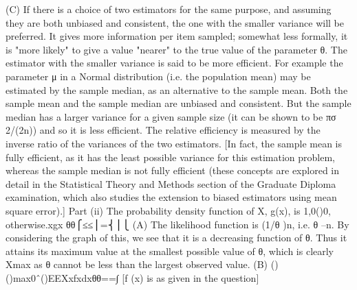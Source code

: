 \documentclass{article}
\begin{document}
\begin{enumerate}[(i)]
(C) If there is a choice of two estimators for the same purpose, and assuming they are both unbiased and consistent, the one with the smaller variance will be preferred. It gives more information per item sampled; somewhat less formally, it is "more likely" to give a value "nearer" to the true value of the parameter θ. The estimator with the smaller variance is said to be more efficient. For example the parameter μ in a Normal distribution (i.e. the population mean) may be estimated by the sample median, as an alternative to the sample mean. Both the sample mean and the sample median are unbiased and consistent. But the sample median has a larger variance for a given sample size (it can be shown to be πσ 2/(2n)) and so it is less efficient. The relative efficiency is measured by the inverse ratio of the variances of the two estimators. [In fact, the sample mean is fully efficient, as it has the least possible variance for this estimation problem, whereas the sample median is not fully efficient (these concepts are explored in detail in the Statistical Theory and Methods section of the
                                                                                                                                                                                                                                                                                                                                                                                                                                                                                                                                                                                                                                                                                                                                                                                                                                                                                                                                                                                                                                                   Graduate Diploma examination, which also studies the extension to biased estimators using mean square error).]
Part (ii)
The probability density function of X, g(x), is 1,0()0, otherwise.xgx θθ⎧≤≤⎪=⎨⎪⎩
(A) The likelihood function is (1/θ )n, i.e. θ –n. By considering the graph of this, we see that it is a decreasing function of θ. Thus it attains its maximum value at the smallest possible value of θ, which is clearly Xmax as θ cannot be less than the largest observed value.
(B) ()()max0ˆ()EEXxfxdxθθ==∫ [f (x) is as given in the question]

\end{enumerate}
\end{document}
